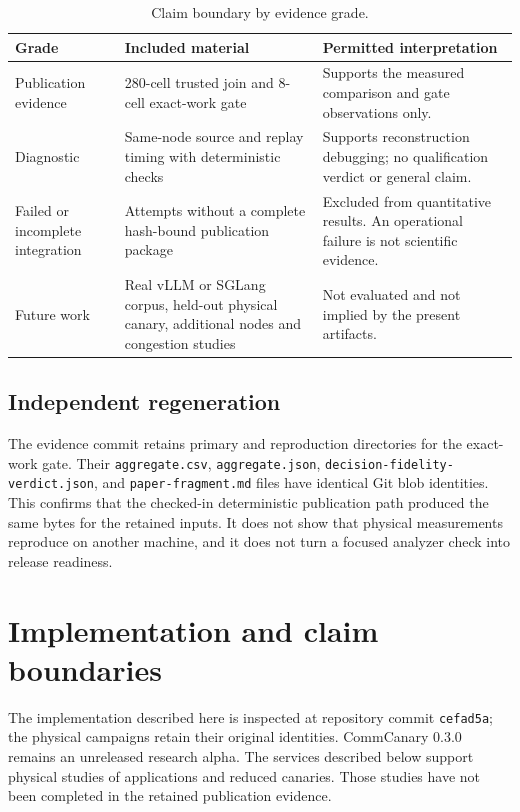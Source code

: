 \documentclass[10pt,twocolumn]{article}
\begin{document}
\begin{table}[t]
\caption{Claim boundary by evidence grade.}
\label{tab:grades}
\centering\small
\begin{tabularx}{\textwidth}{@{}L{0.20\textwidth}L{0.36\textwidth}Y@{}}
\toprule
Grade & Included material & Permitted interpretation \\
\midrule
Publication evidence & 280-cell trusted join and 8-cell exact-work gate &
Supports the measured comparison and gate observations only. \\
Diagnostic & Same-node source and replay timing with deterministic checks &
Supports reconstruction debugging; no qualification verdict or general claim. \\
Failed or incomplete integration & Attempts without a complete hash-bound
publication package & Excluded from quantitative results. An operational
failure is not scientific evidence. \\
Future work & Real vLLM or SGLang corpus, held-out physical canary, additional
nodes and congestion studies & Not evaluated and not implied by the present
artifacts. \\
\bottomrule
\end{tabularx}
\end{table}

\subsection{Independent regeneration}

The evidence commit retains primary and reproduction directories for the
exact-work gate. Their \texttt{aggregate.csv}, \texttt{aggregate.json},
\texttt{decision-fidelity-verdict.json}, and \texttt{paper-fragment.md} files
have identical Git blob identities. This confirms that the checked-in
deterministic publication path produced the same bytes for the retained
inputs. It does not show that physical measurements reproduce on another
machine, and it does not turn a focused analyzer check into release readiness.

\section{Implementation and claim boundaries}
\label{sec:implementation}

The implementation described here is inspected at repository commit
\texttt{cefad5a}; the physical campaigns retain their original identities.
CommCanary 0.3.0 remains an unreleased research alpha. The services described
below support physical studies of applications and reduced canaries. Those
studies have not been completed in the retained publication evidence.
\end{document}
